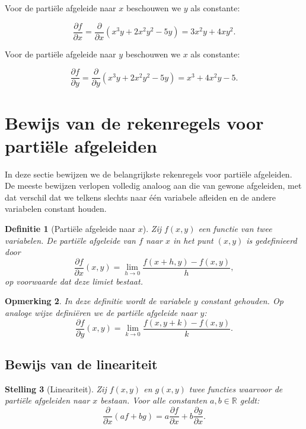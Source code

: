 \documentclass[11pt,a4paper]{article}
\newtheorem{theorem}{Stelling}[section]
\newtheorem{definition}[theorem]{Definitie}
\newtheorem{remark}[theorem]{Opmerking}
\begin{document}
    Voor de partiële afgeleide naar $x$ beschouwen we $y$ als constante:

    \[
        \frac{\partial f}{\partial x}
        =
        \frac{\partial}{\partial x}(x^3y + 2x^2y^2 - 5y)
        =
        3x^2y + 4xy^2.
    \]

    Voor de partiële afgeleide naar $y$ beschouwen we $x$ als constante:

    \[
        \frac{\partial f}{\partial y}
        =
        \frac{\partial}{\partial y}(x^3y + 2x^2y^2 - 5y)
        =
        x^3 + 4x^2y - 5.
    \]


    \section{Bewijs van de rekenregels voor partiële afgeleiden}

    In deze sectie bewijzen we de belangrijkste rekenregels voor partiële afgeleiden.
    De meeste bewijzen verlopen volledig analoog aan die van gewone afgeleiden, met dat
    verschil dat we telkens slechts naar \'e\'en variabele afleiden en de andere variabelen
    constant houden.

    \begin{definition}[Partiële afgeleide naar $x$]
Zij $f(x,y)$ een functie van twee variabelen. De partiële afgeleide van $f$ naar $x$
in het punt $(x,y)$ is gedefinieerd door
\[
    \frac{\partial f}{\partial x}(x,y)
    =
    \lim_{h \to 0}\frac{f(x+h,y)-f(x,y)}{h},
\]
op voorwaarde dat deze limiet bestaat.
    \end{definition}

    \begin{remark}
        In deze definitie wordt de variabele $y$ constant gehouden. Op analoge wijze definiëren
        we de partiële afgeleide naar $y$:
        \[
            \frac{\partial f}{\partial y}(x,y)
            =
            \lim_{k \to 0}\frac{f(x,y+k)-f(x,y)}{k}.
        \]
    \end{remark}

    \subsection{Bewijs van de lineariteit}

    \begin{theorem}[Lineariteit]
Zij $f(x,y)$ en $g(x,y)$ twee functies waarvoor de partiële afgeleiden naar $x$ bestaan.
Voor alle constanten $a,b \in \mathbb{R}$ geldt:
\[
    \frac{\partial}{\partial x}(af+bg)
    =
    a\frac{\partial f}{\partial x}
    +
    b\frac{\partial g}{\partial x}.
\]
    \end{theorem}
\end{document}
